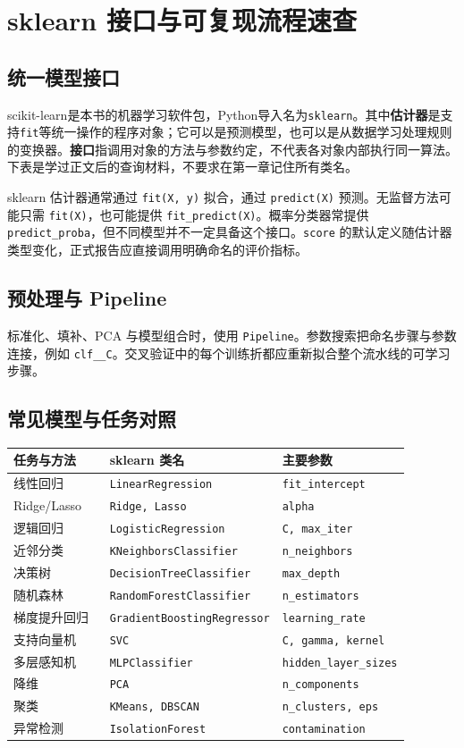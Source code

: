 \chapter{sklearn 接口与可复现流程速查}
\section{统一模型接口}
scikit-learn是本书的机器学习软件包，Python导入名为\texttt{sklearn}。其中\textbf{估计器}是支持\texttt{fit}等统一操作的程序对象；它可以是预测模型，也可以是从数据学习处理规则的变换器。\textbf{接口}指调用对象的方法与参数约定，不代表各对象内部执行同一算法。下表是学过正文后的查询材料，不要求在第一章记住所有类名。

sklearn 估计器通常通过 \texttt{fit(X, y)} 拟合，通过 \texttt{predict(X)} 预测。无监督方法可能只需 \texttt{fit(X)}，也可能提供 \texttt{fit\_predict(X)}。概率分类器常提供 \texttt{predict\_proba}，但不同模型并不一定具备这个接口。\texttt{score} 的默认定义随估计器类型变化，正式报告应直接调用明确命名的评价指标。
\section{预处理与 Pipeline}
标准化、填补、PCA 与模型组合时，使用 \texttt{Pipeline}。参数搜索把命名步骤与参数连接，例如 \texttt{clf\_\_C}。交叉验证中的每个训练折都应重新拟合整个流水线的可学习步骤。
\section{常见模型与任务对照}
\begin{longtable}{p{0.28\linewidth}p{0.35\linewidth}p{0.25\linewidth}}
\toprule
任务与方法&sklearn 类名&主要参数\\\midrule\endhead
线性回归&\texttt{LinearRegression}&\texttt{fit\_intercept}\\
Ridge/Lasso&\texttt{Ridge, Lasso}&\texttt{alpha}\\
逻辑回归&\texttt{LogisticRegression}&\texttt{C, max\_iter}\\
近邻分类&\texttt{KNeighborsClassifier}&\texttt{n\_neighbors}\\
决策树&\texttt{DecisionTreeClassifier}&\texttt{max\_depth}\\
随机森林&\texttt{RandomForestClassifier}&\texttt{n\_estimators}\\
梯度提升回归&\texttt{GradientBoostingRegressor}&\texttt{learning\_rate}\\
支持向量机&\texttt{SVC}&\texttt{C, gamma, kernel}\\
多层感知机&\texttt{MLPClassifier}&\texttt{hidden\_layer\_sizes}\\
降维&\texttt{PCA}&\texttt{n\_components}\\
聚类&\texttt{KMeans, DBSCAN}&\texttt{n\_clusters, eps}\\
异常检测&\texttt{IsolationForest}&\texttt{contamination}\\\bottomrule
\end{longtable}
